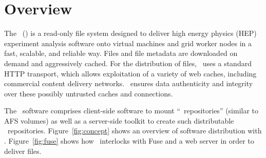 \chapter{Overview}

The \cernvmfs\ (\cvmfs) is a read-only file system designed to deliver high energy physics (HEP) experiment analysis software onto virtual machines and grid worker nodes in a fast, scalable, and reliable way.
Files and file metadata are downloaded on demand and aggressively cached.
For the distribution of files, \cvmfs\ uses a standard HTTP transport, which allows exploitation of a variety of web caches, including commercial content delivery networks.
\cvmfs\ ensures data authenticity and integrity over these possibly untrusted caches and connections. %

The \cvmfs\ software comprises client-side software to mount ``\cvmfs\ repositories'' (similar to AFS volumes) as well as a server-side toolkit to create such distributable \cvmfs\ repositories.
Figure~\ref{fig:concept} shows an overview of software distribution with \cvmfs.
Figure~\ref{fig:fuse} shows how \cvmfs\ interlocks with Fuse and a web server in order to deliver files.

